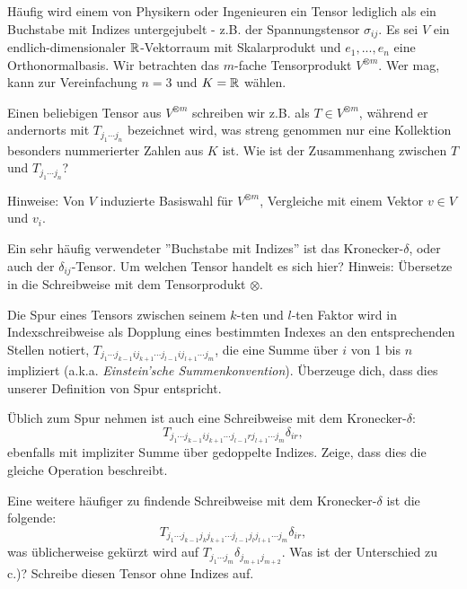 \begin{sheet}
\begin{problem}[title={Aber Tensoren sind doch so Buchstaben mit Indizes}]
	\label{ex:TensorenMitInizes}
	Häufig wird einem von Physikern oder Ingenieuren ein Tensor lediglich als ein Buchstabe mit Indizes untergejubelt - z.B. der Spannungstensor $\sigma_{ij}$. Es sei $V$ ein endlich-dimensionaler $\mathbb{R}$-Vektorraum mit Skalarprodukt und $e_1, ..., e_n$ eine Orthonormalbasis. Wir betrachten das $m$-fache Tensorprodukt $V^{\otimes m}$. Wer mag, kann zur Vereinfachung $n=3$ und $K=\mathbb{R}$ wählen.
	\begin{subproblem}
		Einen beliebigen Tensor aus $V^{\otimes m}$ schreiben wir z.B. als $T\in V^{\otimes m}$, während er andernorts mit $T_{j_1 \cdots j_n}$ bezeichnet wird, was streng genommen nur eine Kollektion besonders nummerierter Zahlen aus $K$ ist. Wie ist der Zusammenhang zwischen $T$ und $T_{j_1 \cdots j_n}$?
		
		Hinweise: Von $V$ induzierte Basiswahl für $V^{\otimes m}$, Vergleiche mit einem Vektor $v\in V$ und $v_i$.
	\end{subproblem}
	\begin{subproblem}
		Ein sehr häufig verwendeter ''Buchstabe mit Indizes'' ist das Kronecker-$\delta$, oder auch der $\delta_{ij}$-Tensor.
		Um welchen Tensor handelt es sich hier?
		Hinweis: Übersetze in die Schreibweise mit dem Tensorprodukt $\otimes$.			
	\end{subproblem}
	\begin{subproblem}
		Die Spur eines Tensors zwischen seinem $k$-ten und $l$-ten Faktor wird in Indexschreibweise als Dopplung eines bestimmten Indexes an den entsprechenden Stellen notiert, $T_{j_1\cdots j_{k-1} i j_{k+1} \cdots j_{l-1} i j_{l+1}  \cdots j_m}$, die eine Summe über $i$ von 1 bis $n$ impliziert (a.k.a. \emph{Einstein'sche Summenkonvention}). Überzeuge dich, dass dies unserer Definition von Spur entspricht. 
		
		Üblich zum Spur nehmen ist auch eine Schreibweise mit dem Kronecker-$\delta$: \[T_{j_1\cdots j_{k-1} i j_{k+1} \cdots j_{l-1} r j_{l+1}  \cdots j_m} \delta_{ir},\] ebenfalls mit impliziter Summe über gedoppelte Indizes. Zeige, dass dies die gleiche Operation beschreibt. 
	\end{subproblem}
	\begin{subproblem}
		Eine weitere häufiger zu findende Schreibweise mit dem Kronecker-$\delta$ ist die folgende:
		\[T_{j_1\cdots j_{k-1} j_{k} j_{k+1} \cdots j_{l-1} j_l j_{l+1}  \cdots j_m} \delta_{ir},\]
		was üblicherweise gekürzt wird auf $T_{j_1\cdots j_m} \delta_{j_{m+1} j_{m+2}}$. Was ist der Unterschied zu c.)? Schreibe diesen Tensor ohne Indizes auf.
	\end{subproblem}
\end{problem}


\end{sheet}
